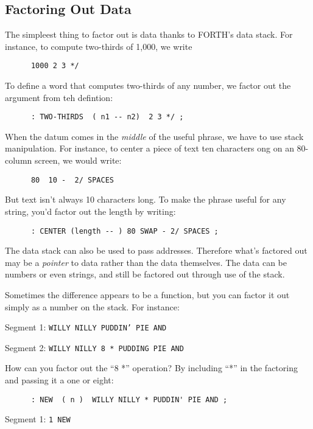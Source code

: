 \subsection{{Factoring Out Data}}
The simpleest thing to factor out is data thanks to FORTH's data stack. For instance, to compute two-thirds of 1,000, we write

\begin{verbatim}
      1000 2 3 */
\end{verbatim}
To define a word that computes two-thirds of any number, we factor out the argument from teh defintion:

\begin{verbatim}
      : TWO-THIRDS  ( n1 -- n2)  2 3 */ ;
\end{verbatim}
When the datum comes in the \textit{middle} of the useful phrase, we have to use stack manipulation. For instance, to center a piece of text ten characters ong on an 80-column screen, we would write:

\begin{verbatim}
      80  10 -  2/ SPACES
\end{verbatim}
But text isn't always 10 characters long. To make the phrase useful for any string, you'd factor out the length by writing:

\begin{verbatim}
      : CENTER (length -- ) 80 SWAP - 2/ SPACES ;
\end{verbatim}
The data stack can also be used to pass addresses. Therefore what's factored out may be a \textit{pointer} to data rather than the data themselves. The data can be numbers or even strings, and still be factored out through use of the stack.
	
Sometimes the difference appears to be a function, but you can factor it out simply as a number on the stack. For instance:

\bigskip

Segment 1:	\texttt{WILLY NILLY  PUDDIN' PIE AND}

Segment 2:	\texttt{WILLY NILLY  8 * PUDDING PIE AND}

\bigskip

\noindent
How can you factor out the ``8 *'' operation? By including ``*'' in the factoring and passing it a one or eight:

\begin{verbatim}
      : NEW  ( n )  WILLY NILLY * PUDDIN' PIE AND ;
\end{verbatim}

Segment 1:    \texttt{1 NEW}

